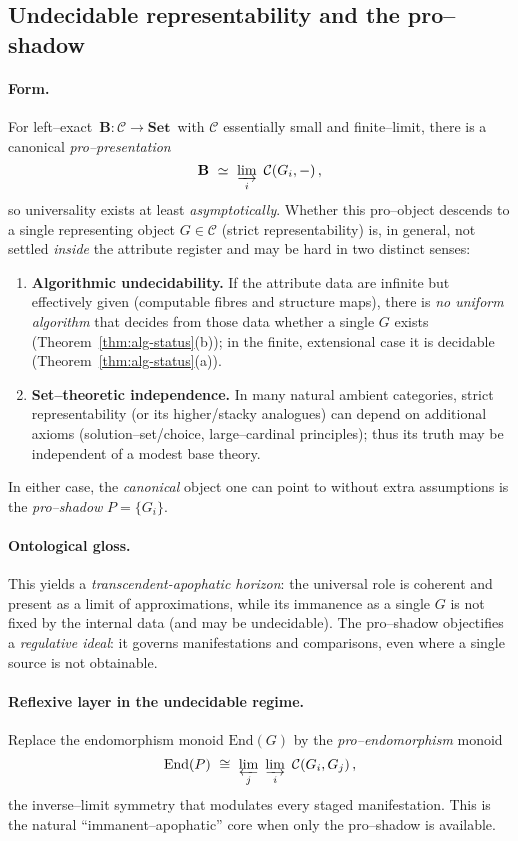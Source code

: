 \documentclass[11pt]{article}
\theoremstyle{upright}
\begin{document}
\subsection{Undecidable representability and the pro–shadow}\label{subsec:undecidable}
\paragraph{Form.}
For left–exact $\,\mathbf B:\mathcal C\to\mathbf{Set}\,$ with $\mathcal C$ essentially small and finite–limit, there is a canonical \emph{pro–presentation}
\[
\mathbf B\ \simeq\ \varinjlim_{i}\ \mathcal C(G_i,-)\,,
\]
so universality exists at least \emph{asymptotically}. Whether this pro–object descends to a single representing object $G\in\mathcal C$ (strict representability) is, in general, not settled \emph{inside} the attribute register and may be hard in two distinct senses:
\begin{enumerate}[leftmargin=2em,label=(\alph*)]
\item \textbf{Algorithmic undecidability.} If the attribute data are infinite but effectively given (computable fibres and structure maps), there is \emph{no uniform algorithm} that decides from those data whether a single $G$ exists (Theorem~\ref{thm:alg-status}(b)); in the finite, extensional case it is decidable (Theorem~\ref{thm:alg-status}(a)).
\item \textbf{Set–theoretic independence.} In many natural ambient categories, strict representability (or its higher/stacky analogues) can depend on additional axioms (solution–set/choice, large–cardinal principles); thus its truth may be independent of a modest base theory.
\end{enumerate}
In either case, the \emph{canonical} object one can point to without extra assumptions is the \emph{pro–shadow} $P=\{G_i\}$.

\paragraph{Ontological gloss.}
This yields a \emph{transcendent-apophatic horizon}: the universal role is coherent and present as a limit of approximations, while its immanence as a single $G$ is not fixed by the internal data (and may be undecidable). The pro–shadow objectifies a \emph{regulative ideal}: it governs manifestations and comparisons, even where a single source is not obtainable.

\paragraph{Reflexive layer in the undecidable regime.}
Replace the endomorphism monoid $\mathrm{End}(G)$ by the \emph{pro–endomorphism} monoid
\[
\mathrm{End}(P)\ \cong\ \varprojlim_{j}\ \varinjlim_{i}\ \mathcal C(G_i,G_j)\,,
\]
the inverse–limit symmetry that modulates every staged manifestation. This is the natural “immanent–apophatic” core when only the pro–shadow is available.
\end{document}
